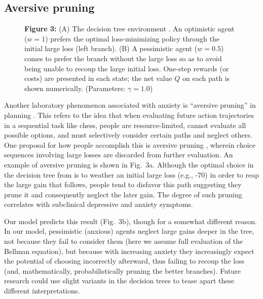 \documentclass[11pt]{article} %
\begin{document}
\subsection{Aversive pruning} 

\begin{figure}[!b]
  \centerline{%
  }
  \par \textbf{Figure 3:} (A) The decision tree environment \cite{Huys2012,Lally2017}. An optimistic agent ($w=1$) prefers the optimal loss-minimizing policy through the initial large loss (left branch). (B) A pessimistic agent ($w=0.5$) comes to prefer the branch without the large loss so as to avoid being unable to recoup the large initial loss. One-step rewards (or costs) are presented in each state; the net value $Q$ on each path is shown numerically. (Parameters: $\gamma = 1.0$)
\end{figure}

Another laboratory phenomenon associated with anxiety is ``aversive pruning'' in planning \cite{Huys2012, Lally2017}. This refers to the idea that when evaluating future action trajectories in a sequential task like chess, people are resource-limited, cannot evaluate all possible options, and must selectively consider certain paths and neglect others. One proposal for how people accomplish this is aversive pruning \citep{Huys2012}, wherein choice sequences involving large losses are discarded from further evaluation. An example of aversive pruning is shown in Fig.~3a. Although the optimal choice in the decision tree from is to weather an initial large loss (e.g., -70) in order to reap the large gain that follows, people tend to disfavor this path suggesting they prune it and consequently neglect the later gain. The degree of such pruning correlates with subclinical depressive \cite{Huys2012} and anxiety \cite{Lally2017} symptoms. 

Our model predicts this result (Fig.~3b), though for a somewhat different reason. In our model, pessimistic (anxious) agents neglect large gains deeper in the tree, not because they fail to consider them (here we assume full evaluation of the Bellman equation), but because with increasing anxiety they increasingly expect the potential of choosing incorrectly afterward, thus failing to recoup the loss (and, mathematically, probabilistically pruning the better branches). Future research could use slight variants in the decision trees to tease apart these different interpretations.
\end{document}

